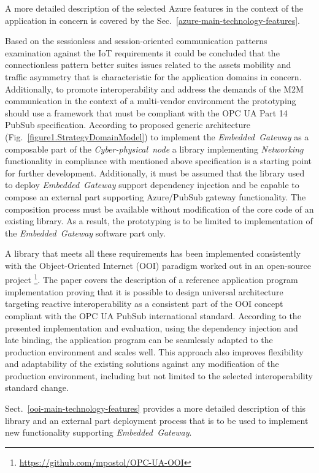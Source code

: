 \documentclass{article}
\begin{document}
A more detailed description of the selected Azure features in the context of the application in concern is covered by the Sec.~\ref{azure-main-technology-features}.

Based on the sessionless and session-oriented communication patterns examination against the IoT requirements \cite{mpostol2020} it could be concluded that the connectionless pattern better suites issues related to the assets mobility and traffic asymmetry that is characteristic for the application domains in concern. Additionally, to promote interoperability and address the demands of the M2M communication in the context of a multi-vendor environment the prototyping should use a framework that must be compliant with the OPC UA Part 14 PubSub  specification. According to proposed generic architecture (Fig.~\ref{figure1.StrategyDomainModel}) to implement the \emph{Embedded\ Gateway} as a composable part of the \emph{Cyber-physical\ node} a library implementing \emph{Networking} functionality in compliance with mentioned above specification is a starting point for further development. Additionally, it must be assumed that the library used to deploy \emph{Embedded\ Gateway} support dependency injection and be capable to compose an external part supporting Azure/PubSub gateway functionality. The composition process must be available without modification of the core code of an existing library. As a result, the prototyping is to be limited to implementation of the \emph{Embedded\ Gateway} software part only.

A library that meets all these requirements has been implemented consistently with the Object-Oriented Internet (OOI) paradigm \cite{mariusz_postol_2020_4361640} worked out in an open-source project \footnote{ \url{https://github.com/mpostol/OPC-UA-OOI} }. The paper \cite{mpostol2020} covers the description of a reference application program implementation proving that it is possible to design universal architecture targeting reactive interoperability as a consistent part of the OOI concept compliant with the OPC UA PubSub international standard. According to the presented implementation and evaluation, using the dependency injection and late binding, the application program can be seamlessly adapted to the production environment and scales well. This approach also improves flexibility and adaptability of the existing solutions against any modification of the production environment, including but not limited to the selected interoperability standard change.

Sect.~\ref{ooi-main-technology-features} provides a more detailed description of this library and an external part deployment process that is to be used to implement new functionality supporting \emph{Embedded\ Gateway}.
\end{document}
